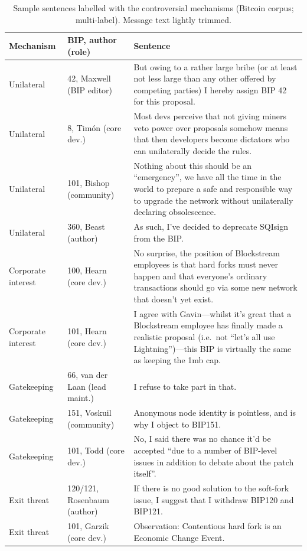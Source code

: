 \documentclass[sigconf,screen]{acmart}
\begin{document}
\begin{table}[t]
\caption{Sample sentences labelled with the controversial mechanisms (Bitcoin corpus; multi-label). Message text lightly trimmed.}
\label{tab:rq6examples}
\small
\begin{tabular}{p{}p{}p{}}
\toprule
Mechanism & BIP, author (role) & Sentence \\
\midrule
Unilateral & 42, Maxwell (BIP editor) & But owing to a rather large bribe (or at least not less large than any other offered by competing parties) I hereby assign BIP 42 for this proposal. \\
Unilateral & 8, Tim\'on (core dev.) & Most devs perceive that not giving miners veto power over proposals somehow means that then developers become dictators who can unilaterally decide the rules. \\
Unilateral & 101, Bishop (community) & Nothing about this should be an ``emergency'', we have all the time in the world to prepare a safe and responsible way to upgrade the network without unilaterally declaring obsolescence. \\
Unilateral & 360, Beast (author) & As such, I've decided to deprecate SQIsign from the BIP. \\
Corporate interest & 100, Hearn (core dev.) & No surprise, the position of Blockstream employees is that hard forks must never happen and that everyone's ordinary transactions should go via some new network that doesn't yet exist. \\
Corporate interest & 101, Hearn (core dev.) & I agree with Gavin---whilst it's great that a Blockstream employee has finally made a realistic proposal (i.e.\ not ``let's all use Lightning'')---this BIP is virtually the same as keeping the 1mb cap. \\
Gatekeeping & 66, van der Laan (lead maint.) & I refuse to take part in that. \\
Gatekeeping & 151, Voskuil (community) & Anonymous node identity is pointless, and is why I object to BIP151. \\
Gatekeeping & 101, Todd (core dev.) & No, I said there was no chance it'd be accepted ``due to a number of BIP-level issues in addition to debate about the patch itself''. \\
Exit threat & 120/121, Rosenbaum (author) & If there is no good solution to the soft-fork issue, I suggest that I withdraw BIP120 and BIP121. \\
Exit threat & 101, Garzik (core dev.) & Observation: Contentious hard fork is an Economic Change Event. \\

\end{tabular}
\end{table}
\end{document}
